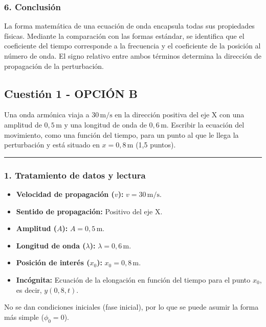 \subsubsection*{6. Conclusión}
\begin{cajaconclusion}
La forma matemática de una ecuación de onda encapsula todas sus propiedades físicas. Mediante la comparación con las formas estándar, se identifica que el coeficiente del tiempo corresponde a la frecuencia y el coeficiente de la posición al número de onda. El signo relativo entre ambos términos determina la dirección de propagación de la perturbación.
\end{cajaconclusion}

\newpage

\subsection{Cuestión 1 - OPCIÓN B}
\label{subsec:2B_2007_jun_ord}

\begin{cajaenunciado}
Una onda armónica viaja a $30\,\text{m/s}$ en la dirección positiva del eje X con una amplitud de $0,5\,\text{m}$ y una longitud de onda de $0,6\,\text{m}$. Escribir la ecuación del movimiento, como una función del tiempo, para un punto al que le llega la perturbación y está situado en $x=0,8\,\text{m}$ (1,5 puntos).
\end{cajaenunciado}
\hrule

\subsubsection*{1. Tratamiento de datos y lectura}
\begin{itemize}
    \item \textbf{Velocidad de propagación ($v$):} $v = 30\,\text{m/s}$.
    \item \textbf{Sentido de propagación:} Positivo del eje X.
    \item \textbf{Amplitud ($A$):} $A = 0,5\,\text{m}$.
    \item \textbf{Longitud de onda ($\lambda$):} $\lambda = 0,6\,\text{m}$.
    \item \textbf{Posición de interés ($x_0$):} $x_0 = 0,8\,\text{m}$.
    \item \textbf{Incógnita:} Ecuación de la elongación en función del tiempo para el punto $x_0$, es decir, $y(0,8, t)$.
\end{itemize}
No se dan condiciones iniciales (fase inicial), por lo que se puede asumir la forma más simple ($\phi_0=0$).

